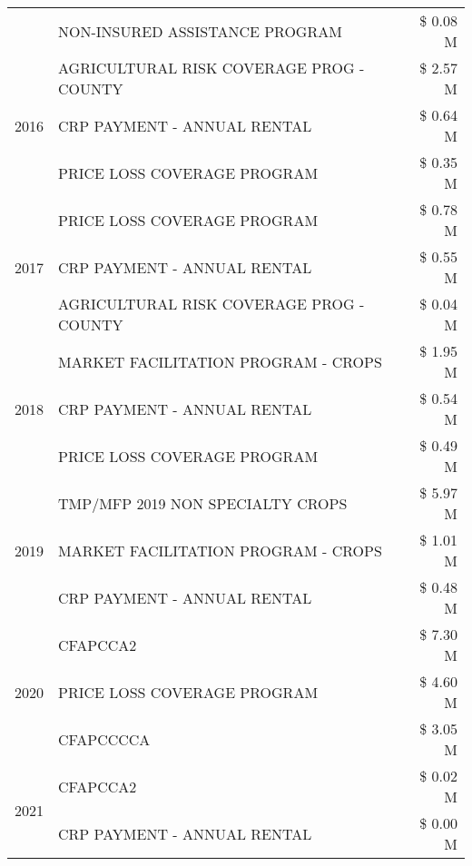\begin{tabular}{llr}
 & NON-INSURED ASSISTANCE PROGRAM & \$ 0.08 M \\
\cline{1-3}
\multirow[t]{3}{*}{2016} & AGRICULTURAL RISK COVERAGE PROG - COUNTY & \$ 2.57 M \\
 & CRP PAYMENT - ANNUAL RENTAL & \$ 0.64 M \\
 & PRICE LOSS COVERAGE PROGRAM & \$ 0.35 M \\
\cline{1-3}
\multirow[t]{3}{*}{2017} & PRICE LOSS COVERAGE PROGRAM & \$ 0.78 M \\
 & CRP PAYMENT - ANNUAL RENTAL & \$ 0.55 M \\
 & AGRICULTURAL RISK COVERAGE PROG - COUNTY & \$ 0.04 M \\
\cline{1-3}
\multirow[t]{3}{*}{2018} & MARKET FACILITATION PROGRAM - CROPS & \$ 1.95 M \\
 & CRP PAYMENT - ANNUAL RENTAL & \$ 0.54 M \\
 & PRICE LOSS COVERAGE PROGRAM & \$ 0.49 M \\
\cline{1-3}
\multirow[t]{3}{*}{2019} & TMP/MFP 2019 NON SPECIALTY CROPS & \$ 5.97 M \\
 & MARKET FACILITATION PROGRAM - CROPS & \$ 1.01 M \\
 & CRP PAYMENT - ANNUAL RENTAL & \$ 0.48 M \\
\cline{1-3}
\multirow[t]{3}{*}{2020} & CFAPCCA2 & \$ 7.30 M \\
 & PRICE LOSS COVERAGE PROGRAM & \$ 4.60 M \\
 & CFAPCCCCA & \$ 3.05 M \\
\cline{1-3}
\multirow[t]{2}{*}{2021} & CFAPCCA2 & \$ 0.02 M \\
 & CRP PAYMENT - ANNUAL RENTAL & \$ 0.00 M \\
\cline{1-3}
\bottomrule
\end{tabular}
